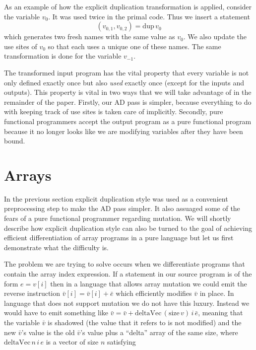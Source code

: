 \documentclass[12pt]{article}
\begin{document}
As an example of how the explicit duplication transformation is applied,
consider the variable $v_0$.  It was used twice in the primal code.
Thus we insert a statement
\[
(v_{0,1}, v_{0,2}) = \mathrm{dup} \, v_0
\]
which generates two fresh names with the same value as $v_0$.  We also
update the use sites of $v_0$ so that each uses a unique one of these
names.  The same transformation is done for the variable $v_{-1}$.

The transformed input program has the vital property that every
variable is not only defined exactly once but also \emph{used} exactly
once (except for the inputs and outputs).  This property is vital in
two ways that we will take advantage of in the remainder of the paper.
Firstly, our AD pass is simpler, because everything to do with keeping
track of use sites is taken care of implicitly.  Secondly, pure
functional programmers accept the output program as a pure functional
program because it no longer looks like we are modifying variables
after they have been bound.

\section{Arrays}

In the previous section explicit duplication style was used as a
convenient preprocessing step to make the AD pass simpler.  It also
assuaged some of the fears of a pure functional programmer regarding
mutation.  We will shortly describe how explicit duplication style can
also be turned to the goal of achieving efficient differentiation of
array programs in a pure language but let us first demonstrate what
the difficulty is.

The problem we are trying to solve occurs when we differentiate
programs that contain the array index expression.  If a statement in
our source program is of the form $e = v[i]$ then in a language that
allows array mutation we could emit the reverse instruction
$\bar{v}[i] = \bar{v}[i] + \bar{e}$ which efficiently modifies
$\bar{v}$ in place.  In language that does not support mutation we do
not have this luxury.  Instead we would have to emit something like
$\bar{v} = \bar{v} + \textrm{deltaVec} \, (\textrm{size} \, v) \, i \,
\bar{e}$, meaning that the variable $\bar{v}$ is shadowed (the value
that it refers to is not modified) and the new $\bar{v}$'s value is the old
$\bar{v}$'s value plus a ``delta'' array of the same size, where
$\textrm{deltaVec} \, n \, i \, e$ is a vector of size $n$ satisfying
\end{document}
